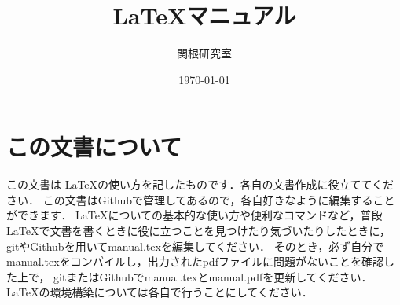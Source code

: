 \documentclass[a4paper,11pt,titlepage]{jsarticle}
\theoremstyle{definition}
\begin{document}
\title{\LaTeX マニュアル}
\author{関根研究室}
\date{\today}
\maketitle

\tableofcontents

\newpage

\section{この文書について}

この文書は \LaTeX の使い方を記したものです．各自の文書作成に役立ててください．
この文書はGithubで管理してあるので，各自好きなように編集することができます．
\LaTeX についての基本的な使い方や便利なコマンドなど，普段 \LaTeX で文書を書くときに役に立つことを見つけたり気づいたりしたときに，
gitやGithubを用いてmanual.texを編集してください．
そのとき，必ず自分でmanual.texをコンパイルし，出力されたpdfファイルに問題がないことを確認した上で，
gitまたはGithubでmanual.texとmanual.pdfを更新してください．
\LaTeX の環境構築については各自で行うことにしてください．
\end{document}
